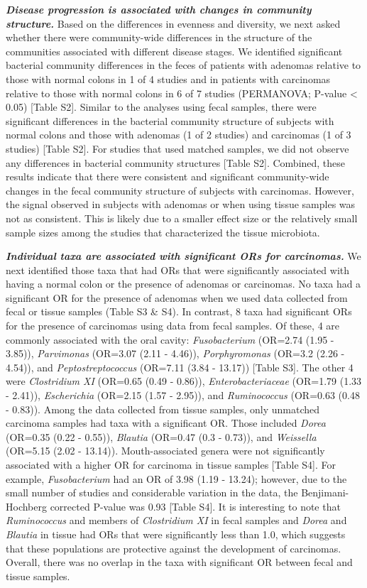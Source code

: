 \documentclass[12pt,]{article}
\begin{document}
\textbf{\emph{Disease progression is associated with changes in
community structure.}} Based on the differences in evenness and
diversity, we next asked whether there were community-wide differences
in the structure of the communities associated with different disease
stages. We identified significant bacterial community differences in the
feces of patients with adenomas relative to those with normal colons in
1 of 4 studies and in patients with carcinomas relative to those with
normal colons in 6 of 7 studies (PERMANOVA; P-value \textless{} 0.05)
{[}Table S2{]}. Similar to the analyses using fecal samples, there were
significant differences in the bacterial community structure of subjects
with normal colons and those with adenomas (1 of 2 studies) and
carcinomas (1 of 3 studies) {[}Table S2{]}. For studies that used
matched samples, we did not observe any differences in bacterial
community structures {[}Table S2{]}. Combined, these results indicate
that there were consistent and significant community-wide changes in the
fecal community structure of subjects with carcinomas. However, the
signal observed in subjects with adenomas or when using tissue samples
was not as consistent. This is likely due to a smaller effect size or
the relatively small sample sizes among the studies that characterized
the tissue microbiota.

\textbf{\emph{Individual taxa are associated with significant ORs for
carcinomas.}} We next identified those taxa that had ORs that were
significantly associated with having a normal colon or the presence of
adenomas or carcinomas. No taxa had a significant OR for the presence of
adenomas when we used data collected from fecal or tissue samples (Table
S3 \& S4). In contrast, 8 taxa had significant ORs for the presence of
carcinomas using data from fecal samples. Of these, 4 are commonly
associated with the oral cavity: \emph{Fusobacterium} (OR=2.74 (1.95 -
3.85)), \emph{Parvimonas} (OR=3.07 (2.11 - 4.46)), \emph{Porphyromonas}
(OR=3.2 (2.26 - 4.54)), and \emph{Peptostreptococcus} (OR=7.11 (3.84 -
13.17)) {[}Table S3{]}. The other 4 were \emph{Clostridium XI} (OR=0.65
(0.49 - 0.86)), \emph{Enterobacteriaceae} (OR=1.79 (1.33 - 2.41)),
\emph{Escherichia} (OR=2.15 (1.57 - 2.95)), and \emph{Ruminococcus}
(OR=0.63 (0.48 - 0.83)). Among the data collected from tissue samples,
only unmatched carcinoma samples had taxa with a significant OR. Those
included \emph{Dorea} (OR=0.35 (0.22 - 0.55)), \emph{Blautia} (OR=0.47
(0.3 - 0.73)), and \emph{Weissella} (OR=5.15 (2.02 - 13.14)).
Mouth-associated genera were not significantly associated with a higher
OR for carcinoma in tissue samples {[}Table S4{]}. For example,
\emph{Fusobacterium} had an OR of 3.98 (1.19 - 13.24); however, due to
the small number of studies and considerable variation in the data, the
Benjimani-Hochberg corrected P-value was 0.93 {[}Table S4{]}. It is
interesting to note that \emph{Ruminococcus} and members of
\emph{Clostridium XI} in fecal samples and \emph{Dorea} and
\emph{Blautia} in tissue had ORs that were significantly less than 1.0,
which suggests that these populations are protective against the
development of carcinomas. Overall, there was no overlap in the taxa
with significant OR between fecal and tissue samples.
\end{document}
